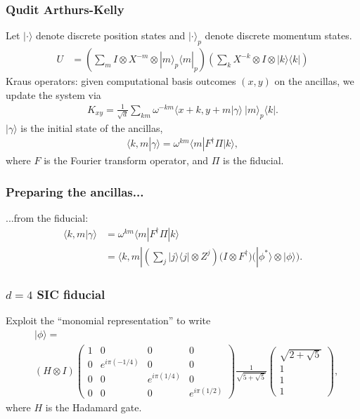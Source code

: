 \documentclass{beamer}
\begin{document}
\begin{frame}
\frametitle{Qudit Arthurs-Kelly}
Let $|\cdot \rangle$ denote discrete position states and $|\cdot\rangle_p$ denote discrete momentum states.
\begin{align}
U &= \left(\sum_m I \otimes X^{-m} \otimes |m\rangle_p\langle m|_p	\right)\left(\sum_k X^{-k} \otimes I \otimes |k\rangle\langle k|\right)
\end{align}
Kraus operators: given computational basis outcomes $(x,y)$ on the ancillas, we update the system via
\begin{align}
K_{xy}=\frac{1}{\sqrt{d}}\sum_{km}\omega^{-km}\langle x+k, y+m|\gamma \rangle \ |m\rangle_p\langle k|	.
\end{align}
$|\gamma\rangle$ is the initial state of the ancillas,
\begin{align}
	\langle k,m|\gamma\rangle=\omega^{km}\langle m|F^\dagger \Pi |k\rangle,
\end{align}
where $F$ is the Fourier transform operator, and $\Pi$ is the fiducial.
\end{frame}

\begin{frame}
\frametitle{Preparing the ancillas...}
...from the fiducial:
\begin{align}
\langle k,m|\gamma\rangle&=\omega^{km}\langle m|F^\dagger \Pi |k\rangle\\
&=\langle k, m|\left(\sum_j |j\rangle\langle j|\otimes Z^j	\right)\Big(I \otimes F^\dagger\Big)\Big(|\phi^*\rangle \otimes |\phi\rangle\Big).
\end{align}
\end{frame}

\begin{frame}
\frametitle{$d=4$ SIC fiducial}
Exploit the ``monomial representation'' to write
\begin{align}
\label{fiducial}
&|\phi\rangle = \nonumber\\
&	(H \otimes I)\begin{pmatrix}1 & 0 & 0 & 0\\ 0 & e^{i\pi(-1/4)} & 0 & 0 \\ 0 & 0 & e^{i\pi (1/4)} & 0 \\ 0 & 0 & 0 & e^{i\pi (1/2)}\end{pmatrix}\frac{1}{\sqrt{5+\sqrt{5}}}\begin{pmatrix} \sqrt{2+\sqrt{5}} \\ 1 \\ 1 \\ 1 \end{pmatrix},
\end{align}	
where $H$ is the Hadamard gate.
\end{frame}
\end{document}
